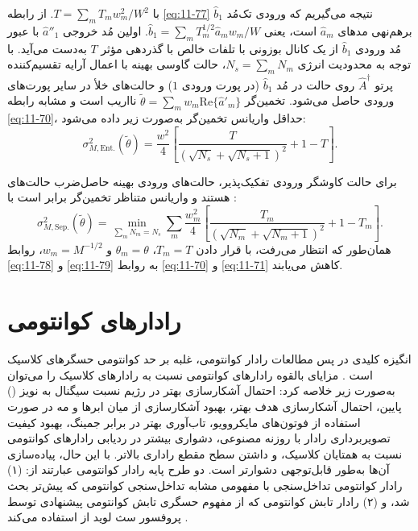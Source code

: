 با $T = \sum_m T_m w_m^2 / W^2$. از رابطه \eqref{eq:11-77} نتیجه می‌گیریم که ورودی تک‌مُد $\hat{b}_1$ برهم‌نهی مدهای $\hat{a}_m$ است، یعنی $\hat{b}_1 = \sum_m T_m^{1/2} \hat{a}_m w_m / W$. اولین مُد خروجی $\hat{a}''_1$ با عبور مُد ورودی $\hat{b}_1$ از یک کانال بوزونی با تلفات خالص با گذردهی مؤثر $T$ به‌دست می‌آید. با توجه به محدودیت انرژی $N_s = \sum_m N_m$، حالت گاوسی بهینه با اعمال آرایه تقسیم‌کننده پرتو $\hat{A}^\dagger$ روی حالت  در مُد $\hat{b}_1$ (در پورت ورودی $1$) و حالت‌های خلأ در سایر پورت‌های ورودی حاصل می‌شود.
تخمین‌گر $\tilde{\theta} = \sum_m w_m \text{Re}\{\hat{a}'_m\}$ نااریب است و مشابه رابطه \eqref{eq:11-70}، حداقل واریانس تخمین‌گر به‌صورت زیر داده می‌شود:
\begin{equation}
	\sigma_{M, \text{Ent.}}^2(\tilde{\theta}) = \frac{w^2}{4} \left[ \frac{T}{(\sqrt{N_s} + \sqrt{N_s + 1})^2} + 1 - T \right].
	\label{eq:11-78}
\end{equation}

برای حالت کاوشگر ورودی تفکیک‌پذیر، حالت‌های ورودی بهینه حاصل‌ضرب حالت‌های  هستند و واریانس متناظر تخمین‌گر برابر است با \cite{20, 25}:
\begin{equation}
	\sigma_{M, \text{Sep.}}^2(\tilde{\theta}) = \min_{\sum_m N_m = N_s} \sum_{m} \frac{w_m^2}{4} \left[ \frac{T_m}{(\sqrt{N_m} + \sqrt{N_m + 1})^2} + 1 - T_m \right].
	\label{eq:11-79}
\end{equation}
همان‌طور که انتظار می‌رفت، با قرار دادن $T_m = T$، $\theta_m = \theta$ و $w_m = M^{-1/2}$، روابط \eqref{eq:11-78} و \eqref{eq:11-79} به روابط \eqref{eq:11-70} و \eqref{eq:11-71} کاهش می‌یابند.

\section{رادارهای کوانتومی}
\label{sec:11-4}
انگیزه کلیدی در پس مطالعات رادار کوانتومی، غلبه بر حد کوانتومی حسگرهای کلاسیک است \cite{7}. مزایای بالقوه رادارهای کوانتومی نسبت به رادارهای کلاسیک را می‌توان به‌صورت زیر خلاصه کرد: احتمال آشکارسازی بهتر در رژیم نسبت سیگنال به نویز () پایین، احتمال آشکارسازی هدف بهتر، بهبود آشکارسازی از میان ابرها و مه در صورت استفاده از فوتون‌های مایکروویو، تاب‌آوری بهتر در برابر جمینگ، بهبود کیفیت تصویربرداری رادار با روزنه مصنوعی، دشواری بیشتر در ردیابی رادارهای کوانتومی نسبت به همتایان کلاسیک، و داشتن سطح مقطع راداری بالاتر. با این حال، پیاده‌سازی آن‌ها به‌طور قابل‌توجهی دشوارتر است. دو طرح پایه رادار کوانتومی عبارتند از: (۱) رادار کوانتومی تداخل‌سنجی با مفهومی مشابه تداخل‌سنجی کوانتومی که پیش‌تر بحث شد، و (۲) رادار تابش کوانتومی که از مفهوم حسگری تابش کوانتومی پیشنهادی توسط پروفسور سث لوید از  استفاده می‌کند \cite{30}.

